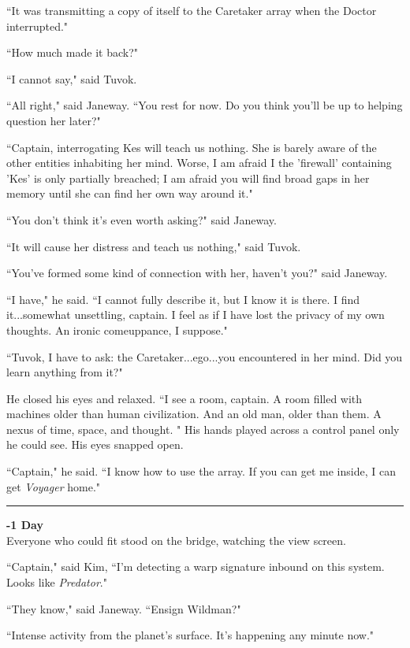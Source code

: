 \documentclass[twoside,letterpaper,12pt]{memoir}
\begin{document}
``It was transmitting a copy of itself to the Caretaker array when the Doctor interrupted." 

``How much made it back?" 

``I cannot say," said Tuvok. 

``All right," said Janeway. ``You rest for now. Do you think you'll be up to helping question her later?" 

``Captain, interrogating Kes will teach us nothing. She is barely aware of the other entities inhabiting her mind. Worse, I am afraid I the 'firewall' containing 'Kes' is only partially breached; I am afraid you will find broad gaps in her memory until she can find her own way around it." 

``You don't think it's even worth asking?" said Janeway. 

``It will cause her distress and teach us nothing," said Tuvok. 

``You've formed some kind of connection with her, haven't you?" said Janeway. 

``I have," he said. ``I cannot fully describe it, but I know it is there. I find it...somewhat unsettling, captain. I feel as if I have lost the privacy of my own thoughts. An ironic comeuppance, I suppose." 

``Tuvok, I have to ask: the Caretaker...ego...you encountered in her mind. Did you learn anything from it?" 

He closed his eyes and relaxed. ``I see a room, captain. A room filled with machines older than human civilization. And an old man, older than them. A nexus of time, space, and thought. " His hands played across a control panel only he could see. His eyes snapped open. 

``Captain," he said. ``I know how to use the array. If you can get me inside, I can get \textit{Voyager} home." 

\begin{center}\rule{3cm}{0.4 pt}\end{center} 

\noindent\textbf{-1 Day}\\

Everyone who could fit stood on the bridge, watching the view screen. 

``Captain," said Kim, ``I'm detecting a warp signature inbound on this system. Looks like \textit{Predator}." 

``They know," said Janeway. ``Ensign Wildman?" 

``Intense activity from the planet's surface. It's happening any minute now." 
\end{document}
